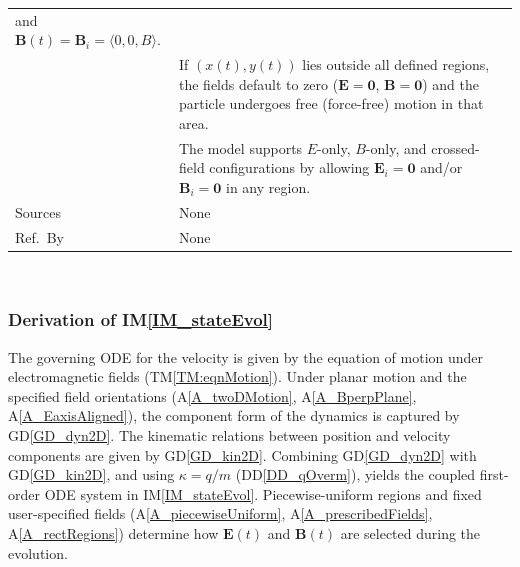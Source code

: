 \documentclass[12pt]{article}
\newcommand{\colAwidth}{0.13\textwidth}
\newcommand{\colBwidth}{0.82\textwidth}
\newcommand{\dref}[1]{GD\ref{#1}}
\newcommand{\ddref}[1]{DD\ref{#1}}
\newcommand{\tref}[1]{TM\ref{#1}}
\newcommand{\aref}[1]{A\ref{#1}}
\newcommand{\iref}[1]{IM\ref{#1}}
\begin{document}
\begin{minipage}{\textwidth}
\begin{tabular}{| p{\colAwidth} | p{\colBwidth}|}
    and $\mathbf{B}(t)=\mathbf{B}_i=\langle 0,0,B\rangle$.\\
  & If $(x(t),y(t))$ lies outside all defined regions, the fields default to zero
  ($\mathbf{E}=\mathbf{0}$, $\mathbf{B}=\mathbf{0}$) and the particle undergoes free
  (force-free) motion in that area.\\
  & The model supports $E$-only, $B$-only, and crossed-field configurations by allowing
  $\mathbf{E}_i=\mathbf{0}$ and/or $\mathbf{B}_i=\mathbf{0}$ in any region.\\
  \hline
  Sources& None\\
  \hline
  Ref.\ By & None\\
  \hline
\end{tabular}
\end{minipage}\\

\subsubsection*{Derivation of \iref{IM_stateEvol}}
The governing ODE for the velocity is given by the equation of motion under electromagnetic
fields (\tref{TM:eqnMotion}). Under planar motion and the specified field orientations
(\aref{A_twoDMotion}, \aref{A_BperpPlane}, \aref{A_EaxisAligned}), the component form of
the dynamics is captured by \dref{GD_dyn2D}. The kinematic relations between position and
velocity components are given by \dref{GD_kin2D}. Combining \dref{GD_dyn2D} with
\dref{GD_kin2D}, and using $\kappa=q/m$ (\ddref{DD_qOverm}), yields the coupled first-order
ODE system in \iref{IM_stateEvol}. Piecewise-uniform regions and fixed user-specified fields
(\aref{A_piecewiseUniform}, \aref{A_prescribedFields}, \aref{A_rectRegions}) determine how
$\mathbf{E}(t)$ and $\mathbf{B}(t)$ are selected during the evolution.

~\newline
\end{document}
